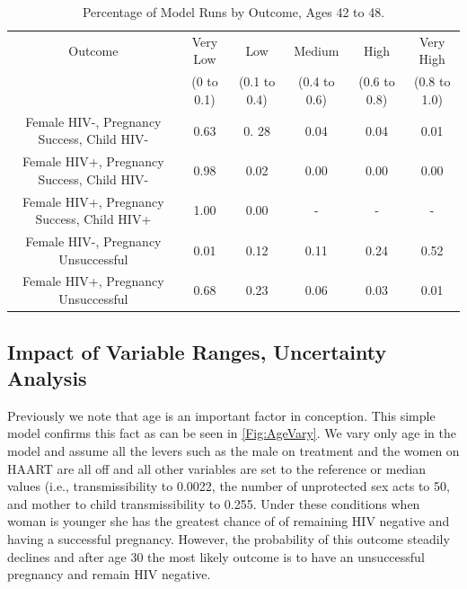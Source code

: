 \documentclass[11pt]{nih_mod}
\begin{document}
\begin{table}	
\begin{center}
\begin{tabular}{|c|c|c|c|c|c|}
\hline
Outcome & Very Low& Low & Medium& High& Very High\\
 & (0 to 0.1) & (0.1 to 0.4) & (0.4 to 0.6) & (0.6 to 0.8) & (0.8 to 1.0)\\
\hline
\hline
Female HIV-, Pregnancy Success, Child HIV- & 0.63 & 0. 28 & 0.04 & 0.04 & 0.01\\
Female HIV+, Pregnancy Success, Child HIV- & 0.98 & 0.02 & 0.00 & 0.00 & 0.00\\
Female HIV+, Pregnancy Success, Child HIV+ & 1.00 & 0.00 & - & - &- \\
Female HIV-, Pregnancy Unsuccessful & 0.01 & 0.12 & 0.11 & 0.24 & 0.52 \\
Female HIV+, Pregnancy Unsuccessful & 0.68 & 0.23 & 0.06 & 0.03 & 0.01\\
\hline
\end{tabular}
	\caption{Percentage of Model Runs by Outcome, Ages 42 to 48. \label{tab:outcomefreqs42}}
\end{center}
\end{table}

\subsection{Impact of Variable Ranges, Uncertainty Analysis}
Previously we note that age is an important factor in conception.  This simple model confirms this fact as can be seen in \ref{Fig:AgeVary}.  We vary only age in the model and assume all the levers such as the male on treatment and the women on HAART are all off and all other variables are set to the reference or median values (i.e., transmissibility to 0.0022, the number of unprotected sex acts to 50, and mother to child transmissibility to 0.255.    Under these conditions when woman is younger she has the greatest chance of of remaining HIV negative and having a successful pregnancy.  However, the probability of this outcome steadily declines and after age 30 the most likely outcome is to have an unsuccessful pregnancy and remain HIV negative.
\end{document}
